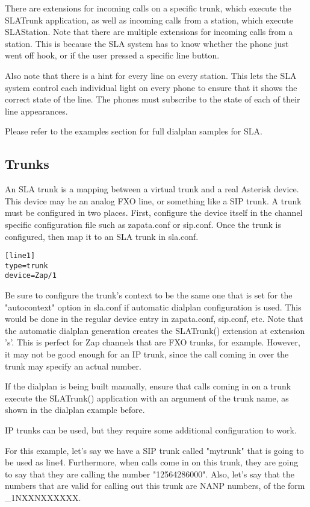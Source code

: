 There are extensions for incoming calls on a specific trunk, which execute the SLATrunk
application, as well as incoming calls from a station, which execute SLAStation.
Note that there are multiple extensions for incoming calls from a station.  This is
because the SLA system has to know whether the phone just went off hook, or if the
user pressed a specific line button.

Also note that there is a hint for every line on every station.  This lets the SLA
system control each individual light on every phone to ensure that it shows the
correct state of the line.  The phones must subscribe to the state of each of their
line appearances.

Please refer to the examples section for full dialplan samples for SLA.

\subsection{Trunks}
\label{trunks}

An SLA trunk is a mapping between a virtual trunk and a real Asterisk device.
This device may be an analog FXO line, or something like a SIP trunk.  A trunk
must be configured in two places.  First, configure the device itself in the
channel specific configuration file such as zapata.conf or sip.conf.  Once the
trunk is configured, then map it to an SLA trunk in sla.conf.  

\begin{verbatim}
[line1]
type=trunk
device=Zap/1
\end{verbatim}

Be sure to configure the trunk's context to be the same one that is set for the
"autocontext" option in sla.conf if automatic dialplan configuration is used.
This would be done in the regular device entry in zapata.conf, sip.conf, etc.
Note that the automatic dialplan generation creates the SLATrunk() extension
at extension 's'.  This is perfect for Zap channels that are FXO trunks, for
example.  However, it may not be good enough for an IP trunk, since the call
coming in over the trunk may specify an actual number.

If the dialplan is being built manually, ensure that calls coming in on a trunk
execute the SLATrunk() application with an argument of the trunk name, as shown
in the dialplan example before.

IP trunks can be used, but they require some additional configuration to work.

For this example, let's say we have a SIP trunk called "mytrunk" that is going
to be used as line4.  Furthermore, when calls come in on this trunk, they are
going to say that they are calling the number "12564286000".  Also, let's say
that the numbers that are valid for calling out this trunk are NANP numbers,
of the form \_1NXXNXXXXXX.

